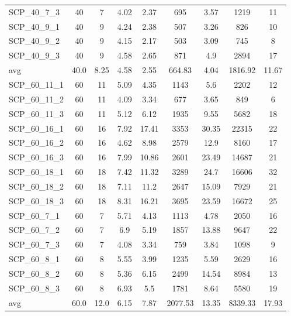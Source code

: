 \begin{table}[!ht]
{\begin{tabular}{lcccccccc}
SCP\_40\_7\_3 & 40 & 7 & 4.02 &  \textcolor{blue2}{2.37} & 695 & 3.57 & 1219 & 11 \\
SCP\_40\_9\_1 & 40 & 9 & 4.24 &  \textcolor{blue2}{2.38} & 507 & 3.26 & 826 & 10 \\
SCP\_40\_9\_2 & 40 & 9 & 4.15 &  \textcolor{blue2}{2.17} & 503 & 3.09 & 745 & 8 \\
SCP\_40\_9\_3 & 40 & 9 & 4.58 &  \textcolor{blue2}{2.65} & 871 & 4.9 & 2894 & 17 \\
\cline{1-9} avg & 40.0 & 8.25 & 4.58 & 2.55& 664.83 & 4.04& 1816.92 & 11.67\\ \cline{1-9}
SCP\_60\_11\_1 & 60 & 11 & 5.09 &  \textcolor{blue2}{4.35} & 1143 & 5.6 & 2202 & 12 \\
SCP\_60\_11\_2 & 60 & 11 & 4.09 &  \textcolor{blue2}{3.34} & 677 & 3.65 & 849 & 6 \\
SCP\_60\_11\_3 & 60 & 11 &  \textcolor{blue2}{5.12} & 6.12 & 1935 & 9.55 & 5682 & 18 \\
SCP\_60\_16\_1 & 60 & 16 &  \textcolor{blue2}{7.92} & 17.41 & 3353 & 30.35 & 22315 & 22 \\
SCP\_60\_16\_2 & 60 & 16 &  \textcolor{blue2}{4.62} & 8.98 & 2579 & 12.9 & 8160 & 17 \\
SCP\_60\_16\_3 & 60 & 16 &  \textcolor{blue2}{7.99} & 10.86 & 2601 & 23.49 & 14687 & 21 \\
SCP\_60\_18\_1 & 60 & 18 &  \textcolor{blue2}{7.42} & 11.32 & 3289 & 24.7 & 16606 & 32 \\
SCP\_60\_18\_2 & 60 & 18 &  \textcolor{blue2}{7.11} & 11.2 & 2647 & 15.09 & 7929 & 21 \\
SCP\_60\_18\_3 & 60 & 18 &  \textcolor{blue2}{8.31} & 16.21 & 3695 & 23.59 & 16672 & 25 \\
SCP\_60\_7\_1 & 60 & 7 & 5.71 &  \textcolor{blue2}{4.13} & 1113 & 4.78 & 2050 & 16 \\
SCP\_60\_7\_2 & 60 & 7 & 6.9 &  \textcolor{blue2}{5.19} & 1857 & 13.88 & 9647 & 22 \\
SCP\_60\_7\_3 & 60 & 7 & 4.08 &  \textcolor{blue2}{3.34} & 759 & 3.84 & 1098 & 9 \\
SCP\_60\_8\_1 & 60 & 8 & 5.55 &  \textcolor{blue2}{3.99} & 1235 & 5.59 & 2629 & 16 \\
SCP\_60\_8\_2 & 60 & 8 &  \textcolor{blue2}{5.36} & 6.15 & 2499 & 14.54 & 8984 & 13 \\
SCP\_60\_8\_3 & 60 & 8 & 6.93 &  \textcolor{blue2}{5.5} & 1781 & 8.64 & 5580 & 19 \\
\cline{1-9} avg & 60.0 & 12.0 & 6.15 & 7.87& 2077.53 & 13.35& 8339.33 & 17.93\\ \cline{1-9}

\end{tabular}}
\end{table}
